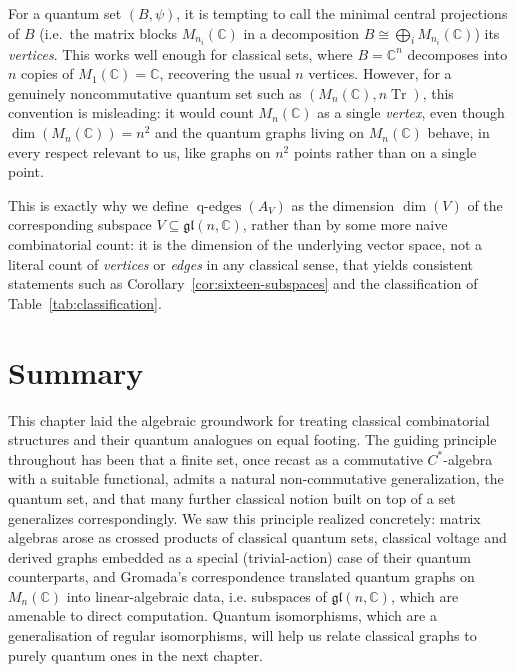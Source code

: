\begin{remark}
    \label{rem:counting-vertices-edges}
    For a quantum set \( (B,\psi) \), it is tempting to call the
    minimal central projections of \( B \) (i.e.\ the matrix blocks
        \( M_{n_i} (\mathbb{C}) \) in a decomposition \( B \cong
    \bigoplus_i M_{n_i} (\mathbb{C}) \))
    its \emph{vertices}. This works well enough for classical sets,
    where \( B = \mathbb{C}^n \) decomposes into \( n \) copies of
    \( M_1 (\mathbb{C}) = \mathbb{C} \), recovering the usual \( n \) vertices.
    However, for a genuinely noncommutative quantum set such as
    \( (M_n (\mathbb{C}), n\operatorname{Tr}) \), this convention is
    misleading: it
    would count \( M_n (\mathbb{C}) \) as a single \emph{vertex}, even though
    \( \dim(M_n (\mathbb{C})) = n^2 \) and the quantum graphs living
    on \( M_n (\mathbb{C}) \)
    behave, in every respect relevant to us, like graphs on \( n^2 \)
    points rather than on a single point.

    This is exactly why we define \( \operatorname{q-edges}(A_V) \)
    as the dimension \( \dim(V) \) of the corresponding subspace
    \( V \subseteq \mathfrak{gl}(n, \mathbb{C}) \), rather than by
    some more naive
    combinatorial count: it is the dimension of the underlying vector
    space, not a literal count of \emph{vertices} or \emph{edges} in
    any classical sense, that yields consistent statements such as
    Corollary~\ref{cor:sixteen-subspaces} and the classification of
    Table~\ref{tab:classification}.
\end{remark}

\section{Summary}
\label{sec:summary-quantum-sets-and-graphs}

This chapter laid the algebraic groundwork for treating classical
combinatorial structures and their quantum analogues on equal footing.
The guiding principle throughout has been that a finite set, once
recast as a commutative \( C^{*} \)-algebra with a suitable functional,
admits a natural non-commutative generalization, the quantum set,
and that many further classical notion built on top of a set generalizes
correspondingly. We saw this principle realized concretely: matrix
algebras arose as crossed products of classical quantum sets,
classical voltage and derived graphs embedded as a special
(trivial-action) case of their quantum counterparts, and Gromada's
correspondence translated quantum graphs on \( M_n (\mathbb{C}) \) into
linear-algebraic data, i.e. subspaces of \( \mathfrak{gl}(n,
\mathbb{C}) \), which are amenable to direct computation. Quantum
isomorphisms, which are a generalisation of regular isomorphisms,
will help us relate classical graphs to purely quantum ones in the
next chapter.

